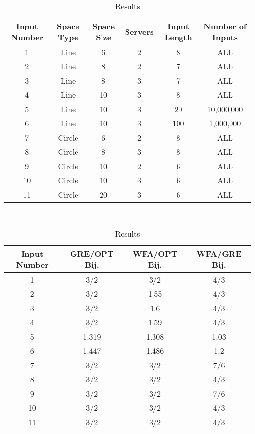 \begin{table}[!htb]
    \begin{minipage}{.5\linewidth}
      \centering
      \begin{tabular}{|c|c|c|c|c|c|}
        \hline
        Input Number & Space Type & Space Size & Servers & Input Length & Number of Inputs\\
        \hline
        1 & Line & 6 & 2 & 8 & ALL \\
        \hline
        2 & Line & 8 & 2 & 7 & ALL \\
        \hline
        3 & Line & 8 & 3 & 7 & ALL\\
        \hline
        4 & Line & 10 & 3 & 8 & ALL\\
        \hline
        5 & Line & 10 & 3 & 20 & 10,000,000\\
        \hline
        6 & Line & 10 & 3 & 100 & 1,000,000\\
        \hline 
        7 & Circle & 6 & 2 & 8 & ALL\\
        \hline
        8 & Circle & 8 & 3 & 8 & ALL\\
        \hline
        9 & Circle & 10 & 2 & 6 & ALL\\
        \hline
        10 & Circle & 10 & 3 & 6 & ALL\\
        \hline
        11 & Circle & 20 & 3 & 6 & ALL \\
        \hline
    \end{tabular}
        \caption{Tests}
        \label{tab:tests}
    \end{minipage}%
    \\
    \begin{minipage}{.5\linewidth}
        \centering
        \begin{tabular}{|c|c|c|c|}
          \hline
          Input Number & GRE/OPT Bij. & WFA/OPT Bij. & WFA/GRE Bij.\\
          \hline
          1 & 3/2 & 3/2 & 4/3\\
          \hline
          2 & 3/2 & 1.55 & 4/3\\
          \hline
          3 & 3/2 & 1.6 & 4/3 \\
          \hline
          4 & 3/2 & 1.59 & 4/3 \\
          \hline
          5 & 1.319 & 1.308 & 1.03 \\
          \hline
          6 & 1.447 & 1.486 & 1.2 \\
          \hline
          7 & 3/2 & 3/2 & 7/6 \\
          \hline
          8 & 3/2 & 3/2 & 4/3 \\
          \hline
          9 & 3/2 & 3/2 & 7/6 \\
          \hline
          10 & 3/2 & 3/2 & 4/3 \\
          \hline
          11 & 3/2 & 3/2 & 4/3 \\
          \hline

      \end{tabular}
          \caption{Results}
          \label{tab:results}
    \end{minipage} 
\end{table}

